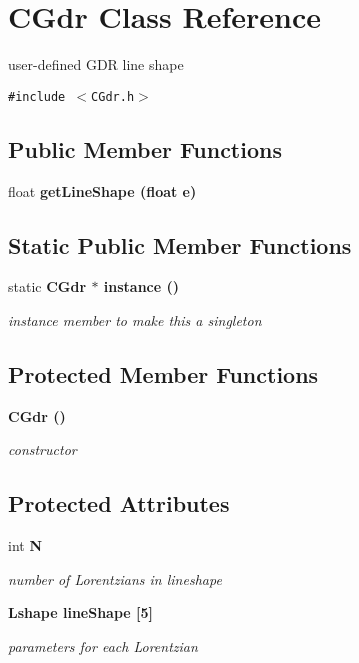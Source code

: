 \section{CGdr Class Reference}
\label{classCGdr}
user-defined GDR line shape  


{\tt \#include $<$CGdr.h$>$}

\subsection*{Public Member Functions}
\begin{CompactItemize}
\item 
float \bf{get\-Line\-Shape} (float e)
\end{CompactItemize}
\subsection*{Static Public Member Functions}
\begin{CompactItemize}
\item 
static \bf{CGdr} $\ast$ \bf{instance} ()\label{classCGdr_131eef37cba9a67f5f6ccc280824c4e0}

\begin{CompactList}\small\item\em instance member to make this a singleton \item\end{CompactList}\end{CompactItemize}
\subsection*{Protected Member Functions}
\begin{CompactItemize}
\item 
\bf{CGdr} ()
\begin{CompactList}\small\item\em constructor \item\end{CompactList}\end{CompactItemize}
\subsection*{Protected Attributes}
\begin{CompactItemize}
\item 
int \bf{N}\label{classCGdr_b42cca3337ea954ce7962f02594da7dc}

\begin{CompactList}\small\item\em number of Lorentzians in lineshape \item\end{CompactList}\item 
\bf{Lshape} \bf{line\-Shape} [5]\label{classCGdr_57ae6b6a88ea9ba25effa74b1cbc3c0b}

\begin{CompactList}\small\item\em parameters for each Lorentzian \item\end{CompactList}\end{CompactItemize}
